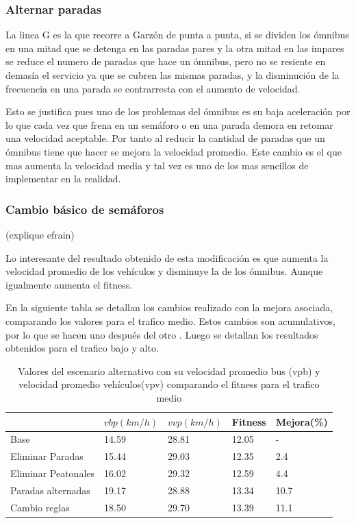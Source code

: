 \subsubsection{Alternar paradas}

La linea G es la que recorre a Garzón de punta a punta, si se dividen los ómnibus en una mitad que se detenga en las paradas pares y la otra mitad en las impares se reduce el numero de paradas que hace un ómnibus, pero no se resiente en demasía el servicio ya que se cubren las mismas paradas, y la disminución de la frecuencia en una parada se contrarresta con el aumento de velocidad.

Esto se justifica pues uno de los problemas del ómnibus es su baja aceleración por lo que cada vez que frena en un semáforo o en una parada demora en retomar una velocidad aceptable. Por tanto al reducir la cantidad de paradas que un ómnibus tiene que hacer se mejora la velocidad promedio.
Este cambio es el que mas aumenta la velocidad media y tal vez es uno de los mas sencillos de implementar en la realidad.

\subsubsection{Cambio básico de semáforos}
(explique efrain)

Lo interesante del resultado obtenido de esta modificación es que aumenta la velocidad promedio de los vehículos y disminuye la de los ómnibus. Aunque igualmente aumenta el fitness. 


En la siguiente tabla se detallan los cambios realizado con la mejora asociada, comparando los valores para el trafico medio. Estos cambios son acumulativos, por lo que se hacen uno después del otro . Luego se detallan los resultados obtenidos para el trafico bajo y alto.


\begin{table}[h]
	\renewcommand{\arraystretch}{1.2}
	\caption{Valores del escenario alternativo con su velocidad promedio bus (vpb) y velocidad promedio vehículos(vpv) comparando el fitness para el trafico medio }
	\label{table:resultado_alternativo}
	\centering
	\begin{tabular}{p{3.5cm}p{2.5cm}p{2.5cm}p{2cm}p{2cm} }
		\hline
		&
		$vbp(km/h)$& 
		$vvp(km/h)$ & 
		Fitness &
		Mejora(\%)
		\\ 
		\hline
		Base & 14.59  & 28.81& 12.05 & -\\
		Eliminar Paradas & 15.44  & 29.03& 12.35 & 2.4\\
		Eliminar Peatonales  & 16.02  & 29.32& 12.59 & 4.4\\
		Paradas alternadas  & 19.17  & 28.88& 13.34 & 10.7\\	
		Cambio reglas  & 18.50  & 29.70& 13.39 & 11.1\\				
		\hline
	\end{tabular}
\end{table}





